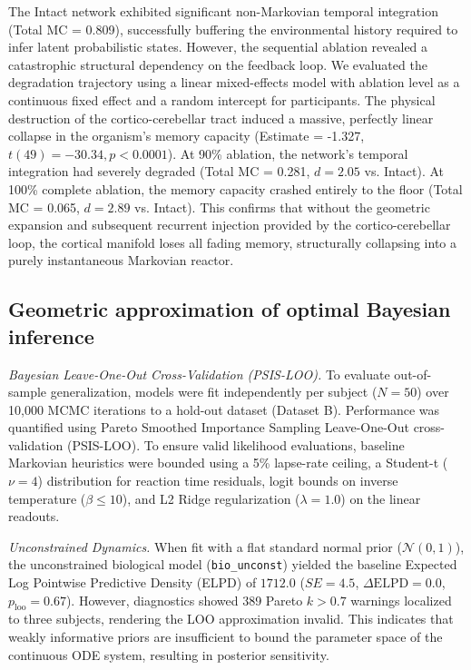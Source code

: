 \documentclass[12pt, a4paper]{extarticle}
\begin{document}
	The Intact network exhibited significant non-Markovian temporal integration (Total MC = 0.809), successfully buffering the environmental history required to infer latent probabilistic states. However, the sequential ablation revealed a catastrophic structural dependency on the feedback loop. We evaluated the degradation trajectory using a linear mixed-effects model with ablation level as a continuous fixed effect and a random intercept for participants. The physical destruction of the cortico-cerebellar tract induced a massive, perfectly linear collapse in the organism's memory capacity (Estimate = -1.327, $t(49) = -30.34, p < 0.0001$). At 90\% ablation, the network's temporal integration had severely degraded (Total MC = 0.281, $d = 2.05$ vs. Intact). At 100\% complete ablation, the memory capacity crashed entirely to the floor (Total MC = 0.065, $d = 2.89$ vs. Intact). This confirms that without the geometric expansion and subsequent recurrent injection provided by the cortico-cerebellar loop, the cortical manifold loses all fading memory, structurally collapsing into a purely instantaneous Markovian reactor.
	
	\subsection{Geometric approximation of optimal Bayesian inference}
	
	\textit{Bayesian Leave-One-Out Cross-Validation (PSIS-LOO).} To evaluate out-of-sample generalization, models were fit independently per subject ($N=50$) over 10,000 MCMC iterations to a hold-out dataset (Dataset B). Performance was quantified using Pareto Smoothed Importance Sampling Leave-One-Out cross-validation (PSIS-LOO). To ensure valid likelihood evaluations, baseline Markovian heuristics were bounded using a 5\% lapse-rate ceiling, a Student-t ($\nu=4$) distribution for reaction time residuals, logit bounds on inverse temperature ($\beta \le 10$), and L2 Ridge regularization ($\lambda=1.0$) on the linear readouts.
	
	\textit{Unconstrained Dynamics.} When fit with a flat standard normal prior ($\mathcal{N}(0,1)$), the unconstrained biological model (\texttt{bio\_unconst}) yielded the baseline Expected Log Pointwise Predictive Density (ELPD) of $1712.0$ ($SE = 4.5$, $\Delta\text{ELPD} = 0.0$, $p_{\text{loo}} = 0.67$). However, diagnostics showed 389 Pareto $k > 0.7$ warnings localized to three subjects, rendering the LOO approximation invalid. This indicates that weakly informative priors are insufficient to bound the parameter space of the continuous ODE system, resulting in posterior sensitivity.
	
\end{document}
